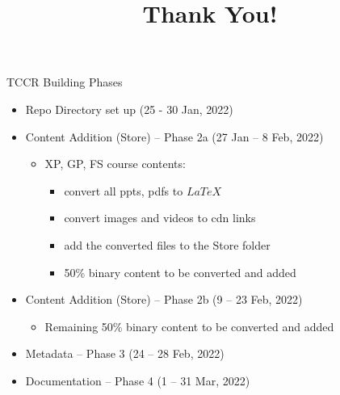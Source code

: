 \documentclass[aspectratio=169,14pt,usenames,dvipsnames]{beamer}
\begin{document}
\begin{frame}{TCCR Building Phases}
\begin{itemize}
	\item Repo Directory set up (25 - 30 Jan, 2022)
	\item Content Addition (Store) – Phase 2a (27 Jan – 8 Feb, 2022)
		\begin{itemize}
		\item XP, GP, FS course contents:
			\begin{itemize}
			\item convert all ppts, pdfs to $LaTeX$
			\item convert images and videos to cdn links
			\item add the converted files to the Store folder
			\item 50\% binary content to be converted and added
			\end{itemize}
		\end{itemize}
	\item Content Addition (Store) – Phase 2b (9 – 23 Feb, 2022)
		\begin{itemize}
		\item Remaining 50\% binary content to be converted and added
		\end{itemize}
	\item Metadata – Phase 3 (24 – 28 Feb, 2022)
	\item Documentation – Phase 4 (1 – 31 Mar, 2022)
\end{itemize}
\end{frame}

{ \1
\begin{frame}
	\title{Thank You!}
	\maketitle
\end{frame}
}
\end{document}

